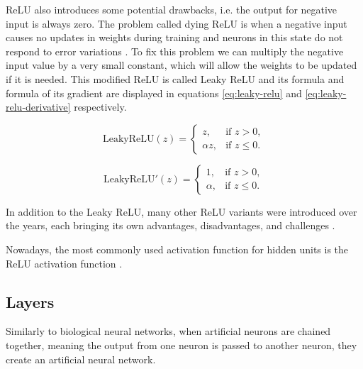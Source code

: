ReLU also introduces some potential drawbacks, i.e. the output for negative input is always zero. The problem called dying ReLU \cite{Dubey2022, Santosh2022-2, Aby2025} is when a negative input causes no updates in weights during training  and neurons in this state do not respond to error variations \cite{Santosh2022-2}. To fix this problem we can multiply the negative input value by a very small constant, which will allow the weights to be updated if it is needed. This modified ReLU is called Leaky ReLU \cite{Maas2013} and its formula and formula of its gradient are displayed in equations \ref{eq:leaky-relu} and \ref{eq:leaky-relu-derivative} respectively.

\noindent
\begin{multicols}{2} %
    \begin{equation}
    \text{LeakyReLU}(z) =
    \begin{cases} 
        z, & \text{if } z > 0, \\
        \alpha z, & \text{if } z \leq 0.
    \end{cases}
    \label{eq:leaky-relu}
    \end{equation}

    \begin{equation}
    \text{LeakyReLU}'(z) =
    \begin{cases} 
        1, & \text{if } z > 0, \\
        \alpha, & \text{if } z \leq 0.
    \end{cases}
    \label{eq:leaky-relu-derivative}
    \end{equation}
\end{multicols}

In addition to the Leaky ReLU, many other ReLU variants were introduced over the years, each bringing its own advantages, disadvantages, and challenges \cite{Dubey2022, Aby2025}.

Nowadays, the most commonly used activation function for hidden units is the ReLU activation function \cite{Dubey2022, Goodfellow2016, LeCun2015}.

\subsection{Layers}

Similarly to biological neural networks, when artificial neurons are chained together, meaning the output from one neuron is passed to another neuron, they create an artificial neural network.

